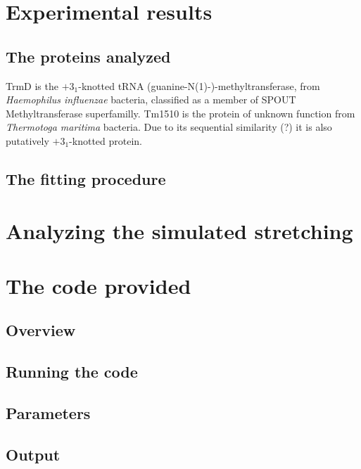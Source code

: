 \documentclass[11pt]{article}
\begin{document}
\section*{Experimental results}
\label{sec:exp}

\subsection*{The proteins analyzed}
\label{subsec:exp_proteins}
TrmD is the $+3_1$-knotted tRNA (guanine-N(1)-)-methyltransferase, from \textit{Haemophilus influenzae} bacteria, classified as a member of SPOUT Methyltransferase superfamilly.
Tm1510 is the protein of unknown function from \textit{Thermotoga maritima} bacteria.
Due to its sequential similarity (?) it is also putatively $+3_1$-knotted protein.

\subsection*{The fitting procedure}

\section{Analyzing the simulated stretching}
\label{sec:theory}

\section{The code provided}
\label{sec:code}
\subsection*{Overview}
\label{subsec:code_overview}

\subsection*{Running the code}
\label{subsec:code_running}

\subsection*{Parameters}
\label{subsec:code_parameters}

\subsection*{Output}
\label{subsec:code_output}
\end{document}
